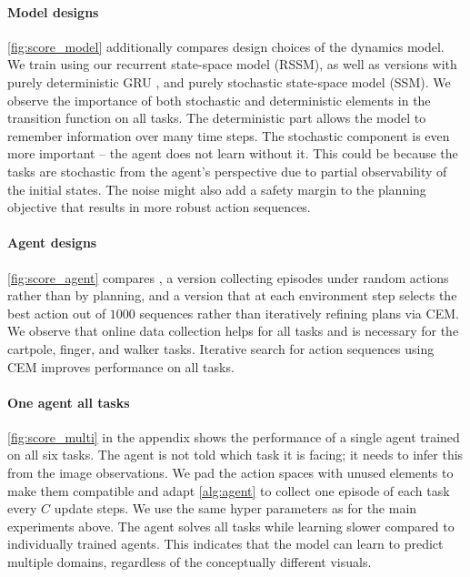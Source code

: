 \paragraph{Model designs}

\cref{fig:score_model} additionally compares design choices of the dynamics model. We train \method using our recurrent state-space model (RSSM), as well as versions with purely deterministic GRU \citep{cho2014gru}, and purely stochastic state-space model (SSM). We observe the importance of both stochastic and deterministic elements in the transition function on all tasks. The deterministic part allows the model to remember information over many time steps. The stochastic component is even more important -- the agent does not learn without it. This could be because the tasks are stochastic from the agent's perspective due to partial observability of the initial states. The noise might also add a safety margin to the planning objective that results in more robust action sequences.

\paragraph{Agent designs}

\cref{fig:score_agent} compares \method, a version collecting episodes under random actions rather than by planning, and a version that at each environment step selects the best action out of $1000$ sequences rather than iteratively refining plans via CEM. We observe that online data collection helps for all tasks and is necessary for the cartpole, finger, and walker tasks. Iterative search for action sequences using CEM improves performance on all tasks.

\paragraph{One agent all tasks}

\cref{fig:score_multi} in the appendix shows the performance of a single agent trained on all six tasks. The agent is not told which task it is facing; it needs to infer this from the image observations. We pad the action spaces with unused elements to make them compatible and adapt \cref{alg:agent} to collect one episode of each task every $C$ update steps. We use the same hyper parameters as for the main experiments above. The agent solves all tasks while learning slower compared to individually trained agents. This indicates that the model can learn to predict multiple domains, regardless of the conceptually different visuals.


